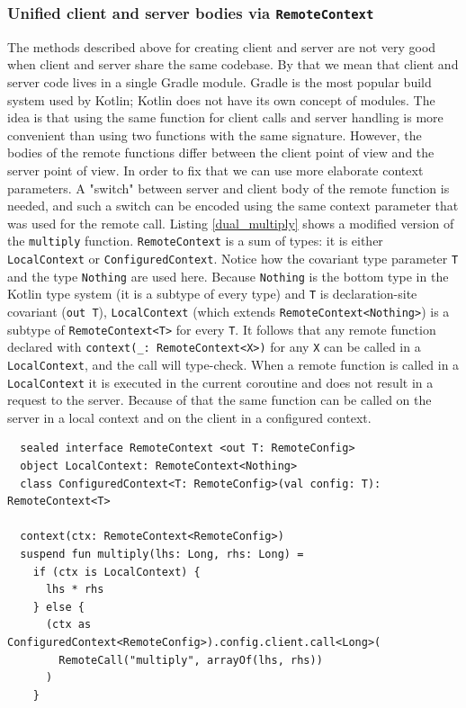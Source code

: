 \documentclass[a4paper,11pt,oneside]{article}
\newcommand{\kotlini}[1]{\texttt{#1}}
\begin{document}
\subsubsection{Unified client and server bodies via \texttt{RemoteContext}}

The methods described above for creating client and server are not very good when client and server share
the same codebase. By that we mean that client and server code lives in a single Gradle module. Gradle
\cite{noauthor_gradle_2026} is the most popular build system used by Kotlin; Kotlin does not have
its own concept of modules. The idea is that using the same function for client calls and server handling
is more convenient than using two functions with the same signature. However, the bodies of the remote functions
differ between the client point of view and the server point of view. In order to fix that we can use more
elaborate context parameters. A "switch" between server and client body of the remote function 
is needed, and such a switch can be encoded using the same context parameter that was used for the remote call.
Listing \ref{dual_multiply} shows a modified version of the \kotlini{multiply} function. \kotlini{RemoteContext}
is a sum of types: it is either \kotlini{LocalContext} or \kotlini{ConfiguredContext}.
Notice how the covariant type parameter \kotlini{T} and the type \kotlini{Nothing} are used here.
Because \kotlini{Nothing} is the bottom type in the Kotlin type system (it is a subtype of every
type) and \kotlini{T} is declaration-site covariant (\kotlini{out T}), \kotlini{LocalContext}
(which extends \kotlini{RemoteContext<Nothing>}) is a subtype of \kotlini{RemoteContext<T>} for
every \kotlini{T}. It follows that any remote function declared with
\kotlini{context(_: RemoteContext<X>)} for any \kotlini{X} can be called in a
\kotlini{LocalContext}, and the call will type-check.
When a remote function is called in a \kotlini{LocalContext} it is executed in the current coroutine and does not
result in a request to the server. Because of that the same function can be called on the server in a
local context and on the client in a configured context.

\begin{listing}[!h]
  \begin{verbatim}
  sealed interface RemoteContext <out T: RemoteConfig>
  object LocalContext: RemoteContext<Nothing>
  class ConfiguredContext<T: RemoteConfig>(val config: T): RemoteContext<T>

  context(ctx: RemoteContext<RemoteConfig>)
  suspend fun multiply(lhs: Long, rhs: Long) =
    if (ctx is LocalContext) {
      lhs * rhs
    } else {
      (ctx as ConfiguredContext<RemoteConfig>).config.client.call<Long>(
        RemoteCall("multiply", arrayOf(lhs, rhs))
      )
    }
  \end{verbatim}
  \caption{Updated multiply}\label{dual_multiply}
\end{listing}
\end{document}
